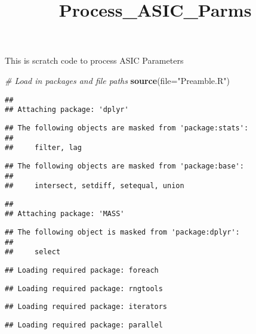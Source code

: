 \documentclass[
]{article}
\title{Process\_ASIC\_Parms}
\author{}
\date{\vspace{-2.5em}}
\newenvironment{Shaded}{\begin{snugshade}}{\end{snugshade}}
\newcommand{\AttributeTok}[1]{\textcolor[rgb]{0.13,0.29,0.53}{#1}}
\newcommand{\CommentTok}[1]{\textcolor[rgb]{0.56,0.35,0.01}{\textit{#1}}}
\newcommand{\FunctionTok}[1]{\textcolor[rgb]{0.13,0.29,0.53}{\textbf{#1}}}
\newcommand{\NormalTok}[1]{#1}
\newcommand{\StringTok}[1]{\textcolor[rgb]{0.31,0.60,0.02}{#1}}
\begin{document}
\maketitle

This is scratch code to process ASIC Parameters

\begin{Shaded}
\begin{Highlighting}[]
\CommentTok{\# Load in packages and file paths}
\FunctionTok{source}\NormalTok{(}\AttributeTok{file=}\StringTok{"Preamble.R"}\NormalTok{)}
\end{Highlighting}
\end{Shaded}

\begin{verbatim}
## 
## Attaching package: 'dplyr'
\end{verbatim}

\begin{verbatim}
## The following objects are masked from 'package:stats':
## 
##     filter, lag
\end{verbatim}

\begin{verbatim}
## The following objects are masked from 'package:base':
## 
##     intersect, setdiff, setequal, union
\end{verbatim}

\begin{verbatim}
## 
## Attaching package: 'MASS'
\end{verbatim}

\begin{verbatim}
## The following object is masked from 'package:dplyr':
## 
##     select
\end{verbatim}

\begin{verbatim}
## Loading required package: foreach
\end{verbatim}

\begin{verbatim}
## Loading required package: rngtools
\end{verbatim}

\begin{verbatim}
## Loading required package: iterators
\end{verbatim}

\begin{verbatim}
## Loading required package: parallel
\end{verbatim}
\end{document}
